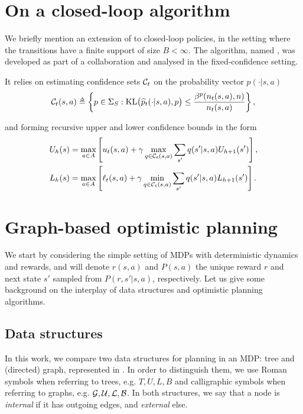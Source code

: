 \section{On a closed-loop algorithm}

We briefly mention an extension of \KLOLOP to closed-loop policies, in the setting where the transitions have a finite support of size $B < \infty$. The algorithm, named \MDPGapE, was developed as part of a collaboration \citep{jonsson2020planning} and analysed in the fixed-confidence setting.

It relies on estimating confidence sets $\mathcal{C}_t$ on the probability vector $p(\cdot|s,a)$
$$\cC_t(s,a) \eqdef \left\{p\in \Sigma_S :  \KL\!\big(\hp_t(\cdot|s,a),p\big) \leq \frac {\beta^p(n_t(s,a), n)} {n_t(s,a)}\right\},$$

and forming recursive upper and lower confidence bounds in the form
\begin{align*}
U_{h}(s) &= \max_{a\in A} \left[u_t(s,a) + \gamma \max_{q \in \mathcal{C}_t(s,a)} \sum_{s'} q(s'|s,a) U_{h+1}(s')\right], \\
L_{h}(s) &= \max_{a\in A} \left[\ell_t(s,a) + \gamma \min_{q \in \mathcal{C}_t(s,a)} \sum_{s'} q(s'|s,a)L_{h+1}(s')\right].
\end{align*}

\section{Graph-based optimistic planning}
\label{sec:gbopd}

We start by considering the simple setting of MDPs with deterministic dynamics and rewards, and will denote $r(s,a)$ and $P(s,a)$ the unique reward $r$ and next state $s'$ sampled from $P\left(r,s'|s,a\right)$, respectively.
Let us give some background on the interplay of data structures and optimistic planning algorithms.

\subsection{Data structures}

In this work, we compare two data structures for planning in an MDP: tree and (directed) graph, represented in . In order to distinguish them, we use Roman symbols when referring to trees, e.g. $T, U, L, B$ and calligraphic symbols when referring to graphs, e.g. $\mathcal{G}, \mathcal{U}, \mathcal{L}, \mathcal{B}$. In both structures, we say that a node is \emph{internal} if it has outgoing edges, and \emph{external} else.

